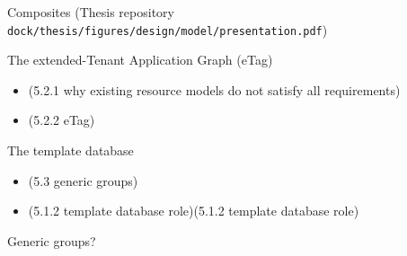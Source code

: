 \begin{frame}{Composites}
    (Thesis repository \texttt{dock/thesis/figures/design/model/presentation.pdf})
\end{frame}

\begin{frame}{The extended-Tenant Application Graph (eTag)}
    \begin{itemize}
        \item (5.2.1 why existing resource models do not satisfy all requirements)
        \item (5.2.2 eTag)
    \end{itemize}
\end{frame}

\begin{frame}{The template database}
    \begin{itemize}
        \item (5.3 generic groups)
        \item (5.1.2 template database role)(5.1.2 template database role)
    \end{itemize}
    \end{frame}

\begin{frame}{Generic groups?} %
\end{frame}
